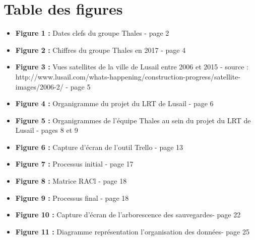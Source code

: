 \chapter*{Table des figures} %

\begin{itemize}
\item \textbf{Figure 1 :} Dates clefs du groupe Thales - page 2
\item \textbf{Figure 2 :} Chiffres du groupe Thales en 2017 - page 4
\item \textbf{Figure 3 :} Vues satellites de la ville de Lusail entre 2006 et 2015 - source : http://www.lusail.com/whats-happening/construction-progress/satellite-images/2006-2/ - page 5
\item \textbf{Figure 4 :} Organigramme du projet du LRT de Lusail - page 6
\item \textbf{Figure 5 :} Organigrammes de l'équipe Thales au sein du projet du LRT de Lusail - pages 8 et 9
\item \textbf{Figure 6 :} Capture d'écran de l'outil Trello - page 13
\item \textbf{Figure 7 :} Processus initial - page 17
\item \textbf{Figure 8 :} Matrice RACl - page 18
\item \textbf{Figure 9 :} Processus final - page 18
\item \textbf{Figure 10 :} Capture d'écran de l'arborescence des sauvegardes- page 22
\item \textbf{Figure 11 :} Diagramme représentation l'organisation des données- page 25
\end{itemize}